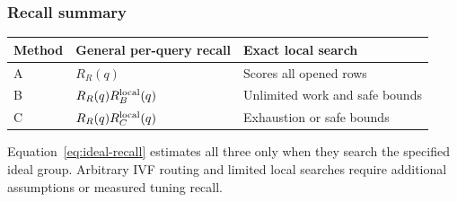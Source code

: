 \subsubsection*{Recall summary}
\begin{center}\small
\begin{tabularx}{\linewidth}{@{}lYY@{}}\toprule
Method & General per-query recall & Exact local search\\\midrule
A & $R_R(q)$ & Scores all opened rows\\
B & $R_R(q)R_B^{\rm local}(q)$ & Unlimited work and safe bounds\\
C & $R_R(q)R_C^{\rm local}(q)$ & Exhaustion or safe bounds\\\bottomrule
\end{tabularx}\normalsize
\end{center}
Equation~\ref{eq:ideal-recall} estimates all three only when they search the specified ideal
group. Arbitrary IVF routing and limited local searches require additional assumptions or
measured tuning recall.
